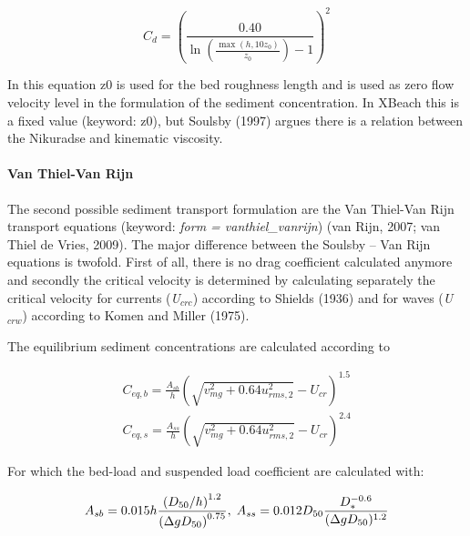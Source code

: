 \documentclass{article}
\begin{document}
\noindent 
\begin{equation} \label{ZEqnNum280790} 
C_{d} =\left(\frac{0.40}{\ln \left(\frac{\max (h,10z_{0} )}{z_{0} } \right)-1} \right)^{2}  
\end{equation} 


\noindent In this equation z0 is used for the bed roughness length and is used as zero flow velocity level in the formulation of the sediment concentration. In XBeach this is a fixed value (keyword: z0), but Soulsby (1997) argues there is a relation between the Nikuradse and kinematic viscosity.  $\; $  


\paragraph{ Van Thiel-Van Rijn}

\noindent The second possible sediment transport formulation are the Van Thiel-Van Rijn transport equations (keyword: \textit{form = vanthiel\_vanrijn}) (van Rijn, 2007; van Thiel de Vries, 2009). The major difference between the Soulsby -- Van Rijn equations is twofold. First of all, there is no drag coefficient calculated anymore and secondly the critical velocity is determined by calculating separately the critical velocity for currents (\textit{U${}_{crc}$}) according to Shields (1936) and for waves (\textit{U${}_{crw}$}) according to Komen and Miller (1975).

\noindent 

\noindent The equilibrium sediment concentrations are calculated according to

\noindent 
\begin{equation} \label{2.94)} 
\begin{array}{l} {C_{eq,b} =\frac{A_{sb} }{h} \left(\sqrt{v_{mg} ^{2} +0.64u_{rms,2}^{2} } -U_{cr} \right)^{1.5} } \\ {C_{eq,s} =\frac{A_{ss} }{h} \left(\sqrt{v_{mg} ^{2} +0.64u_{rms,2}^{2} } -U_{cr} \right)^{2.4} } \end{array} 
\end{equation} 


\noindent For which the bed-load and suspended load coefficient are calculated with:

\noindent 
\begin{equation} \label{2.95)} 
A_{sb} =0.015h\frac{\left(D_{50} /h\right)^{1.2} }{\left(\Delta gD_{50} \right)^{0.75} } ,{\rm \; }A_{ss} =0.012D_{50} \frac{D_{*}^{-0.6} }{(\Delta gD_{50} )^{1.2} }  
\end{equation} 
\end{document}
